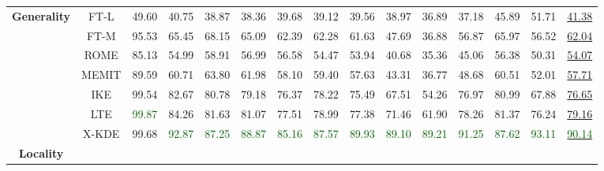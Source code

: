 \begin{table*}[!h]
{\begin{tabular}{ccccccccccccccc}
           \midrule
            \multirow{7}{*}{\textbf{Generality}} 
            & FT-L &  49.60 &  40.75 &  38.87 &  38.36 &  39.68 &  39.12 &  39.56 &  38.97 &  36.89 &  37.18 &  45.89 &  51.71 &  \underline{41.38} \\
            & FT-M &  95.53 &  65.45 &  68.15 &  65.09 &  62.39 &  62.28 &  61.63 &  47.69 &  36.88 &  56.87 &  65.97 &  56.52 &  \underline{62.04} \\
            & ROME &  85.13 &  54.99 &  58.91 &  56.99 &  56.58 &  54.47 &  53.94 &  40.68 &  35.36 &  45.06 &  56.38 &  50.31 &  \underline{54.07} \\
            & MEMIT &  89.59 &  60.71 &  63.80 &  61.98 &  58.10 &  59.40 &  57.63 &  43.31 &  36.77 &  48.68 &  60.51 &  52.01 &  \underline{57.71} \\
            & IKE & 99.54 & 82.67 & 80.78 & 79.18 & 76.37 & 78.22 & 75.49 & 67.51 & 54.26 & 76.97 & 80.99 & 67.88 & \underline{76.65} \\
            & LTE & \textcolor{darkgreen}{99.87} & 84.26 & 81.63 & 81.07 & 77.51 & 78.99 & 77.38 & 71.46 & 61.90 & 78.26 & 81.37 & 76.24 & \underline{79.16} \\
           \cmidrule{2-15}
           & X-KDE & 99.68 & \textcolor{darkgreen}{92.87} & \textcolor{darkgreen}{87.25} & \textcolor{darkgreen}{88.87} & \textcolor{darkgreen}{85.16} & \textcolor{darkgreen}{87.57} & \textcolor{darkgreen}{89.93} & \textcolor{darkgreen}{89.10} & \textcolor{darkgreen}{89.21} & \textcolor{darkgreen}{91.25} & \textcolor{darkgreen}{87.62} & \textcolor{darkgreen}{93.11} & \underline{\textcolor{darkgreen}{90.14}} \\
           \midrule
           \multirow{7}{*}{\textbf{Locality}} 
           

\end{tabular}}
\end{table*}
